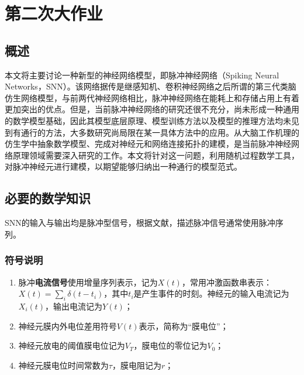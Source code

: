 \documentclass[11pt]{article}
\begin{document}
\section{第二次大作业}
\subsection{概述}
本文将主要讨论一种新型的神经网络模型，即脉冲神经网络（Spiking Neural Networks，SNN）。该网络据传是继感知机、卷积神经网络之后所谓的第三代类脑仿生网络模型，与前两代神经网络相比，脉冲神经网络在能耗上和存储占用上有着更加突出的优点。但是，当前脉冲神经网络的研究还很不充分，尚未形成一种通用的数学模型基础，因此其模型底层原理、模型训练方法以及模型的推理方法均未见到有通行的方法，大多数研究尚局限在某一具体方法中的应用。从大脑工作机理的仿生学中抽象数学模型、完成对神经元和网络连接拓扑的建模，是当前脉冲神经网络原理领域需要深入研究的工作。本文将针对这一问题，利用随机过程数学工具，对脉冲神经元进行建模，以期望能够归纳出一种通行的模型范式。
\subsection{必要的数学知识}
SNN的输入与输出均是脉冲型信号，根据文献\cite{jaegerEncyclopediaComputationalNeuroscience2015}，描述脉冲信号通常使用脉冲序列。
\subsubsection{符号说明}
\begin{enumerate}
  \item 脉冲\textbf{电流信号}使用增量序列表示，记为$X(t)$，常用冲激函数串表示：$X(t)=\sum\limits_i\delta(t-t_i)$，其中$t_i$是产生事件的时刻。神经元的输入电流记为$X_i(t)$，输出电流记为$Y(t)$；
  \item 神经元膜内外电位差用符号$V(t)$表示，简称为“膜电位”；
  \item 神经元放电的阈值膜电位记为$V_T$，膜电位的零位记为$V_0$；
  \item 神经元膜电位时间常数为$\tau$，膜电阻记为$r$；
\end{enumerate}
\end{document}
